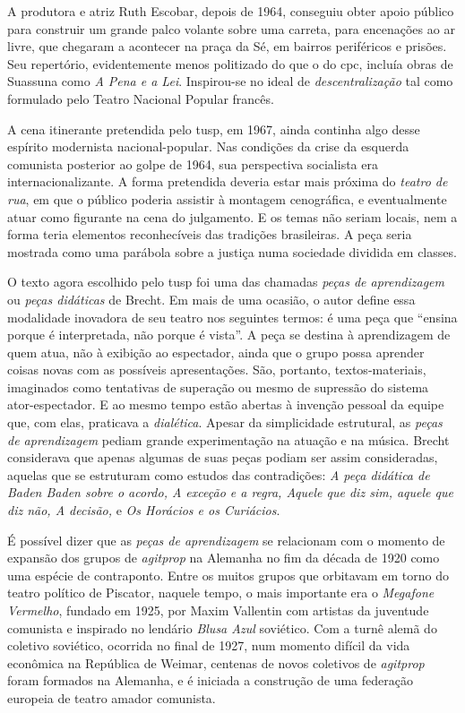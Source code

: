 A produtora e atriz Ruth Escobar, depois de 1964, conseguiu obter apoio
público para construir um grande palco volante sobre uma carreta, para
encenações ao ar livre, que chegaram a acontecer na praça da Sé, em
bairros periféricos e prisões. Seu repertório, evidentemente menos
politizado do que o do {\sc cpc}, incluía obras de Suassuna como {\it A Pena e
a Lei}. Inspirou-se no ideal de {\it descentralização} tal como
formulado pelo Teatro Nacional Popular francês.

A cena itinerante pretendida pelo {\sc tusp}, em 1967, ainda continha algo
desse espírito modernista nacional-popular. Nas condições da crise da
esquerda comunista posterior ao golpe de 1964, sua perspectiva
socialista era internacionalizante. A forma pretendida deveria estar
mais próxima do {\it teatro de rua}, em que o público poderia assistir à
montagem cenográfica, e eventualmente atuar como figurante na cena do
julgamento. E os temas não seriam locais, nem a forma teria elementos
reconhecíveis das tradições brasileiras. A peça seria mostrada como uma
parábola sobre a justiça numa sociedade dividida em classes.

\subject{Estudo de formas cênico-dramatúrgicas: aprendizagem e agitprop}

O texto agora escolhido pelo {\sc tusp} foi uma das chamadas {\it peças de
aprendizagem} ou {\it peças didáticas} de Brecht. Em mais de uma
ocasião, o autor define essa modalidade inovadora de seu teatro nos
seguintes termos: é uma peça que “ensina porque é interpretada, não
porque é vista”. A peça se destina à aprendizagem de quem atua, não à
exibição ao espectador, ainda que o grupo possa aprender coisas novas
com as possíveis apresentações. São, portanto, textos-materiais,
imaginados como tentativas de superação ou mesmo de supressão do sistema
ator-espectador. E ao mesmo tempo estão abertas à invenção pessoal da
equipe que, com elas, praticava a {\it dialética}. Apesar da
simplicidade estrutural, as {\it peças de aprendizagem} pediam grande
experimentação na atuação e na música. Brecht considerava que apenas
algumas de suas peças podiam ser assim consideradas, aquelas que se
estruturam como estudos das contradições: {\it A peça didática de Baden
Baden sobre o acordo, A exceção e a regra, Aquele que diz sim, aquele
que diz não, A decisão,} e {\it Os Horácios e os Curiácios}.

É possível dizer que as {\it peças de aprendizagem} se relacionam com o
momento de expansão dos grupos de {\it agitprop} na Alemanha no fim da
década de 1920 como uma espécie de contraponto. Entre os muitos grupos
que orbitavam em torno do teatro político de Piscator, naquele tempo, o
mais importante era o {\it Megafone Vermelho}, fundado em 1925, por
Maxim Vallentin com artistas da juventude comunista e inspirado no
lendário {\it Blusa Azul} soviético. Com a turnê alemã do coletivo
soviético, ocorrida no final de 1927, num momento difícil da vida
econômica na República de Weimar, centenas de novos coletivos de
{\it agitprop} foram formados na Alemanha, e é iniciada a construção de
uma federação europeia de teatro amador comunista.


